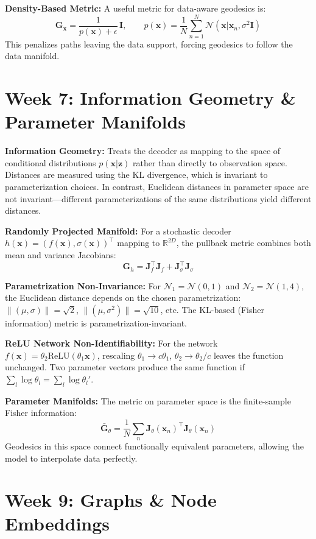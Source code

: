\documentclass[12pt]{article}
\begin{document}
\textbf{Density-Based Metric:} A useful metric for data-aware geodesics is:
\[
\bm{G}_{\bm{x}} = \frac{1}{p(\bm{x}) + \epsilon}\,\bm{I}, \qquad p(\bm{x}) = \frac{1}{N}\sum_{n=1}^N \mathcal{N}(\bm{x}|\bm{x}_n, \sigma^2\bm{I})
\]
This penalizes paths leaving the data support, forcing geodesics to follow the data manifold.

\section*{Week 7: Information Geometry \& Parameter Manifolds}

\textbf{Information Geometry:} Treats the decoder as mapping to the space of conditional distributions $p(\bm{x}|\bm{z})$ rather than directly to observation space. Distances are measured using the KL divergence, which is invariant to parameterization choices. In contrast, Euclidean distances in parameter space are not invariant---different parameterizations of the same distributions yield different distances.

\textbf{Randomly Projected Manifold:} For a stochastic decoder $h(\bm{x}) = (f(\bm{x}), \sigma(\bm{x}))^\top$ mapping to $\mathbb{R}^{2D}$, the pullback metric combines both mean and variance Jacobians:
\[
\bm{G}_h = \bm{J}_f^\top \bm{J}_f + \bm{J}_\sigma^\top \bm{J}_\sigma
\]

\textbf{Parametrization Non-Invariance:} For $\mathcal{N}_1 = \mathcal{N}(0,1)$ and $\mathcal{N}_2 = \mathcal{N}(1,4)$, the Euclidean distance depends on the chosen parametrization: $\|(\mu,\sigma)\| = \sqrt{2}$, $\|(\mu,\sigma^2)\| = \sqrt{10}$, etc. The KL-based (Fisher information) metric is parametrization-invariant.

\textbf{ReLU Network Non-Identifiability:} For the network $f(\bm{x}) = \theta_2 \text{ReLU}(\theta_1 \bm{x})$, rescaling $\theta_1 \to c\theta_1$, $\theta_2 \to \theta_2/c$ leaves the function unchanged. Two parameter vectors produce the same function if $\sum_l \log \theta_l = \sum_l \log \theta_l'$.

\textbf{Parameter Manifolds:} The metric on parameter space is the finite-sample Fisher information:
\[
\bar{\bm{G}}_\theta = \frac{1}{N}\sum_n \bm{J}_\theta(\bm{x}_n)^\top \bm{J}_\theta(\bm{x}_n)
\]
Geodesics in this space connect functionally equivalent parameters, allowing the model to interpolate data perfectly.

\section*{Week 9: Graphs \& Node Embeddings}
\end{document}
